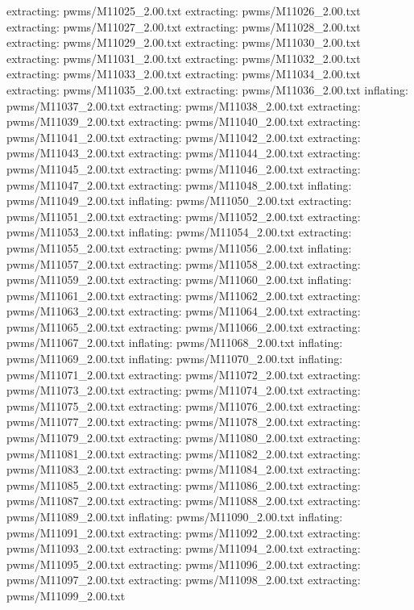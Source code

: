\documentclass[letterpaper,10pt,english]{sphinxmanual}
\begin{document}
{\begin{sphinxVerbatim}[commandchars=\\\{\}]
 extracting: pwms/M11025\_2.00.txt
 extracting: pwms/M11026\_2.00.txt
 extracting: pwms/M11027\_2.00.txt
 extracting: pwms/M11028\_2.00.txt
 extracting: pwms/M11029\_2.00.txt
 extracting: pwms/M11030\_2.00.txt
 extracting: pwms/M11031\_2.00.txt
 extracting: pwms/M11032\_2.00.txt
 extracting: pwms/M11033\_2.00.txt
 extracting: pwms/M11034\_2.00.txt
 extracting: pwms/M11035\_2.00.txt
 extracting: pwms/M11036\_2.00.txt
  inflating: pwms/M11037\_2.00.txt
 extracting: pwms/M11038\_2.00.txt
 extracting: pwms/M11039\_2.00.txt
 extracting: pwms/M11040\_2.00.txt
 extracting: pwms/M11041\_2.00.txt
 extracting: pwms/M11042\_2.00.txt
 extracting: pwms/M11043\_2.00.txt
 extracting: pwms/M11044\_2.00.txt
 extracting: pwms/M11045\_2.00.txt
 extracting: pwms/M11046\_2.00.txt
 extracting: pwms/M11047\_2.00.txt
 extracting: pwms/M11048\_2.00.txt
  inflating: pwms/M11049\_2.00.txt
  inflating: pwms/M11050\_2.00.txt
 extracting: pwms/M11051\_2.00.txt
 extracting: pwms/M11052\_2.00.txt
 extracting: pwms/M11053\_2.00.txt
  inflating: pwms/M11054\_2.00.txt
 extracting: pwms/M11055\_2.00.txt
 extracting: pwms/M11056\_2.00.txt
  inflating: pwms/M11057\_2.00.txt
 extracting: pwms/M11058\_2.00.txt
 extracting: pwms/M11059\_2.00.txt
 extracting: pwms/M11060\_2.00.txt
  inflating: pwms/M11061\_2.00.txt
 extracting: pwms/M11062\_2.00.txt
 extracting: pwms/M11063\_2.00.txt
 extracting: pwms/M11064\_2.00.txt
 extracting: pwms/M11065\_2.00.txt
 extracting: pwms/M11066\_2.00.txt
 extracting: pwms/M11067\_2.00.txt
  inflating: pwms/M11068\_2.00.txt
  inflating: pwms/M11069\_2.00.txt
  inflating: pwms/M11070\_2.00.txt
  inflating: pwms/M11071\_2.00.txt
 extracting: pwms/M11072\_2.00.txt
 extracting: pwms/M11073\_2.00.txt
 extracting: pwms/M11074\_2.00.txt
 extracting: pwms/M11075\_2.00.txt
 extracting: pwms/M11076\_2.00.txt
 extracting: pwms/M11077\_2.00.txt
 extracting: pwms/M11078\_2.00.txt
 extracting: pwms/M11079\_2.00.txt
 extracting: pwms/M11080\_2.00.txt
 extracting: pwms/M11081\_2.00.txt
 extracting: pwms/M11082\_2.00.txt
 extracting: pwms/M11083\_2.00.txt
 extracting: pwms/M11084\_2.00.txt
 extracting: pwms/M11085\_2.00.txt
 extracting: pwms/M11086\_2.00.txt
 extracting: pwms/M11087\_2.00.txt
 extracting: pwms/M11088\_2.00.txt
 extracting: pwms/M11089\_2.00.txt
  inflating: pwms/M11090\_2.00.txt
  inflating: pwms/M11091\_2.00.txt
 extracting: pwms/M11092\_2.00.txt
 extracting: pwms/M11093\_2.00.txt
 extracting: pwms/M11094\_2.00.txt
 extracting: pwms/M11095\_2.00.txt
 extracting: pwms/M11096\_2.00.txt
 extracting: pwms/M11097\_2.00.txt
 extracting: pwms/M11098\_2.00.txt
 extracting: pwms/M11099\_2.00.txt

\end{sphinxVerbatim}}
\end{document}
